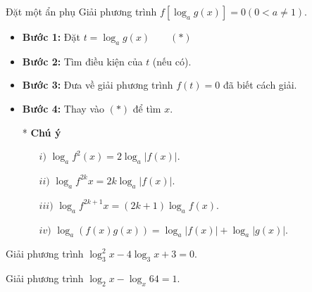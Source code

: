 \begin{dang}{Đặt một ẩn phụ}
	Giải phương trình $f\left[\log_a g(x)\right]=0  \left(0<a\ne 1\right).$
\begin{itemize}
	\item  \textbf{Bước 1:} Đặt $t=\log_a g(x)\qquad (*)$ 
	\item \textbf{Bước 2:} Tìm điều kiện của $t$ (nếu có).
	\item \textbf{Bước 3:} Đưa về giải phương trình $f(t)=0$ đã biết cách giải.
	\item \textbf{Bước 4:} Thay vào $(*)$ để tìm $x$.
	\item [*] \textbf{Chú ý}
	\begin{itemize}
		\item [$i)$] $\log_af^2(x)=2\log_a\left| f(x)\right|.$
		\item [$ii)$] $\log_af^{2k}x=2k\log_a\left| f(x)\right|.$
		\item [$iii)$] $\log_a{f}^{2k+1}x=\left(2k+1\right)\log_af(x).$
		\item [$iv)$] $\log_a\left(f(x)g(x)\right)=\log_a\left| f(x)\right|+\log_a\left| g(x)\right|.$
	\end{itemize}
\end{itemize}
\end{dang}
\begin{vd}%
Giải phương trình $\log^2_{3}x-4\log_3 x+3=0.$
\end{vd}
\begin{vd}%
	Giải phương trình $\log_2x-\log_x64=1.$
\end{vd}

